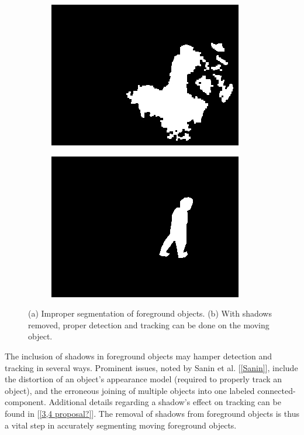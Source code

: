 \documentclass[12pt]{report}
\begin{document}
\begin{figure}
\begin{subfigure}{.49\linewidth}
    \includegraphics[width=1\linewidth]{figures/background/room_0295_blob.jpg}
    \caption{}
  \end{subfigure}
  \hfill
  \begin{subfigure}{.49\linewidth}
  \centering
    \includegraphics[width=1\linewidth]{figures/background/room_0295_clean.jpg}
    \caption{}
  \end{subfigure}
  \caption{(a) Improper segmentation of foreground objects. (b) With shadows removed, proper detection and tracking can be done on the moving object.}
\label{fig:nonshadow}
\end{figure}

The inclusion of shadows in foreground objects may hamper detection and tracking in several ways. Prominent issues, noted by Sanin et al. [\ref{Sanin}], include the distortion of an object's appearance model (required to properly track an object), and the erroneous joining of multiple objects into one labeled connected-component. Additional details regarding a shadow's effect on tracking can be found in [\ref{3,4 proposal?}]. The removal of shadows from foreground objects is thus a vital step in accurately segmenting moving foreground objects.
\end{document}
